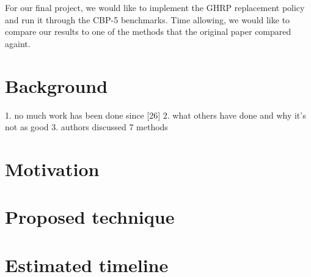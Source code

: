 \documentclass[11pt]{article}
\begin{document}
For our final project, we would like to implement the GHRP replacement policy and run it through the CBP-5 benchmarks. Time allowing, we would like to compare our 
results to one of the methods that the original paper compared againt.
\section{Background}
1. no much work has been done since [26]
2. what others have done and why it's not as good
3. authors discussed 7 methods 
\section{Motivation}
\section{Proposed technique}
\section{Estimated timeline}
\label{sec:related}

 
{%


}
\end{document}
